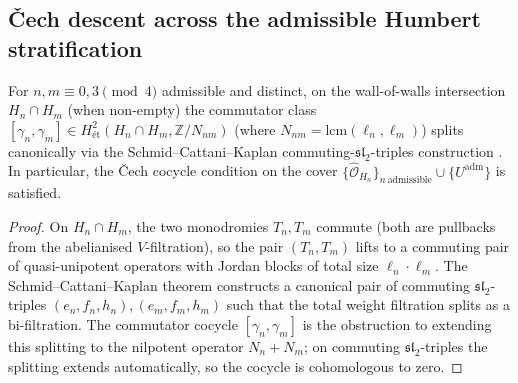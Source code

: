 \subsection{Čech descent across the admissible Humbert
stratification}
\label{subsec:bcac-cech-descent}

\begin{lemma}
\label{lem:bcac-triple-intersection-cocycle-splits}
\ClaimStatusProvedHere
{}
For $n,m\equiv 0,3\pmod 4$ admissible and distinct, on the
wall-of-walls intersection $H_n\cap H_m$ (when non-empty) the
commutator class
$[\gamma_n,\gamma_m]\in H^2_{\text{\'et}}(H_n\cap H_m,\mathbb{Z}/N_{nm})$
(where $N_{nm}=\mathrm{lcm}(\ell_n,\ell_m)$) splits canonically
via the Schmid--Cattani--Kaplan commuting-$\mathfrak{sl}_2$-triples
construction \cite{CattaniKaplanSchmid86}. In particular, the
\v Cech cocycle condition on the cover
$\{\widehat{\mathcal{O}}_{H_n}\}_{n\ \text{admissible}}\cup
\{U^{\mathrm{adm}}\}$ is satisfied.
\end{lemma}

\begin{proof}
On $H_n\cap H_m$, the two monodromies $T_n,T_m$ commute
(both are pullbacks from the abelianised $V$-filtration), so the
pair $(T_n,T_m)$ lifts to a commuting pair of quasi-unipotent
operators with Jordan blocks of total size $\ell_n\cdot\ell_m$.
The Schmid--Cattani--Kaplan theorem
\cite[\S4.2]{CattaniKaplanSchmid86} constructs a canonical pair of
commuting $\mathfrak{sl}_2$-triples
$(e_n,f_n,h_n),(e_m,f_m,h_m)$ such that the total weight filtration
splits as a bi-filtration. The commutator cocycle $[\gamma_n,\gamma_m]$
is the obstruction to extending this splitting to the nilpotent
operator $N_n+N_m$; on commuting $\mathfrak{sl}_2$-triples the
splitting extends automatically, so the cocycle is cohomologous to
zero.
\end{proof}


